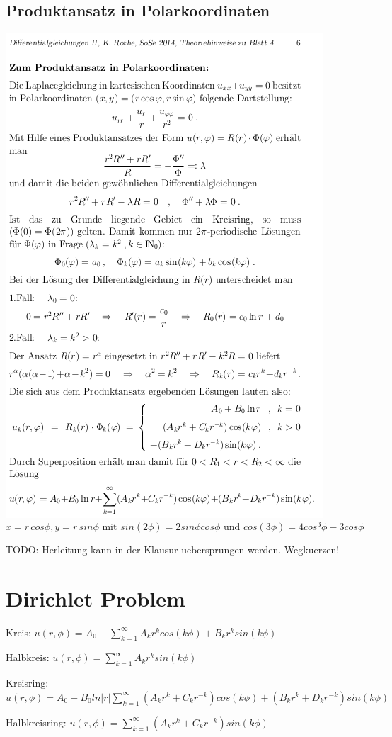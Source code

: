 \documentclass[10pt,a4paper]{article}
\begin{document}
\subsection{Produktansatz in Polarkoordinaten}
\includegraphics[scale=0.6]{ununderstandable}
\[
x = r\,cos\phi, y=r\,sin\phi \mbox{ mit } sin(2\phi)=2sin\phi cos\phi \mbox{ und } cos(3\phi)=4cos^3\phi - 3cos \phi
\]

TODO: Herleitung kann in der Klausur uebersprungen werden. Wegkuerzen!

\section{Dirichlet Problem}
Kreis: $u(r, \phi) = A_0 + \sum\limits_{k=1}^\infty A_k r^k cos(k \phi) + B_k r^k sin(k \phi)$

Halbkreis: $u(r, \phi) = \sum\limits_{k=1}^\infty A_k r^k sin(k \phi)$

Kreisring: $u(r, \phi) = A_0 + B_0 ln|r| \sum\limits_{k=1}^\infty \left(A_k r^k + C_k r^{-k} \right) cos(k \phi) + \left(B_k r^k + D_k r^{-k} \right) sin(k \phi)$

Halbkreisring: $u(r, \phi) = \sum\limits_{k=1}^\infty \left(A_k r^k + C_k r^{-k} \right) sin(k \phi)$
\end{document}
